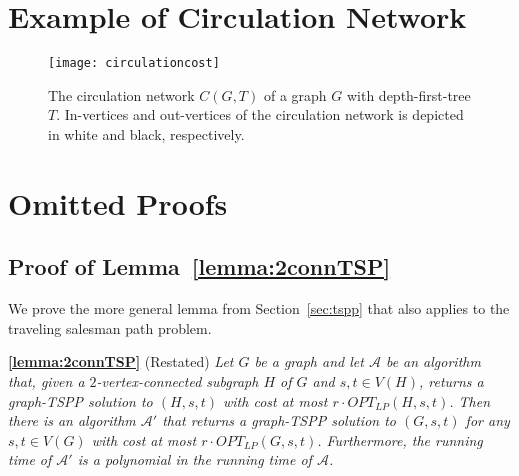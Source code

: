\documentclass[letterpaper,11pt]{article}
\newenvironment{applemma}{\begin{trivlist}
        \item[\hskip\labelsep {\bf Lemma}]}{ \end{trivlist}}
\newcommand{\OLP}[1]{\ensuremath{OPT_{LP}(#1)}}
\newcommand{\HPP}{graph-TSPP\xspace}
\begin{document}
\section{Example of Circulation Network}
\begin{figure}[hbtp]
\begin{center}
\texttt{[image: circulationcost]}
\end{center}
\caption{The circulation network $C(G,T)$ of a graph $G$ with depth-first-tree $T$. In-vertices and out-vertices of the circulation network is depicted in white and black, respectively.}
\label{fig:circreplace_appendix}

\end{figure}

\section{Omitted Proofs}


\subsection{Proof of Lemma~\ref{lemma:2connTSP}}
\label{app:2connTSP}
We prove the more general lemma from Section~\ref{sec:tspp} that also applies to the traveling
salesman path problem.
\begin{applemma}{\textbf{\ref{lemma:2connTSP}}} (Restated) \emph{
Let $G$ be a graph and let $\mathcal{A}$ be an algorithm that, given a
$2$-vertex-connected subgraph $H$ of $G$ and $s,t \in V(H)$, returns a
\HPP{} solution to $(H,s,t)$ with cost at most $r \cdot
\OLP{H,s,t}$. Then there is an algorithm
$\mathcal{A}'$ that returns a \HPP{} solution to $(G,s,t)$ for any
$s,t\in V(G)$ with cost at most $r \cdot \OLP{G,s,t}$. Furthermore, the
running time of $\mathcal{A}'$ is a polynomial in the running time of
$\mathcal{A}$.}
\end{applemma}
\end{document}
